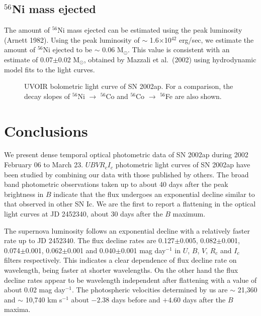 \subsection{${}^{56}$Ni mass ejected}

The amount of $^{56}$Ni mass ejected can be estimated using the peak luminosity (Arnett 1982).
Using the peak luminosity of $\sim$ 1.6$\times$10$^{42}$ erg/sec, we estimate the
amount of $^{56}$Ni ejected to be $\sim$ 0.06 M$_{\odot}$. This value is 
consistent with an estimate of 0.07$\pm$0.02 M$_{\odot}$, obtained by Mazzali
et al.\ (2002) using hydrodynamic model fits to the light curves. 

\begin{figure}
\caption{UVOIR bolometric light curve of SN 2002ap. For a comparison, the decay slopes of 
${}^{56}$Ni $\rightarrow$ ${}^{56}$Co and ${}^{56}$Co $\rightarrow$ ${}^{56}$Fe are also shown.} 
\end{figure}

\section{Conclusions}

We present dense temporal optical photometric data of SN 2002ap
during 2002 February 06 to March 23. $UBVR_cI_c$ photometric light curves of SN
2002ap have been studied by combining our data with those published by
others. The broad band photometric observations taken up to about 40 days 
after the peak brightness in $B$ indicate that the flux undergoes an
exponential decline similar to that observed in other SN Ic. We are the 
first to report a flattening in the optical light curves at JD 2452340, 
about 30 days after the $B$ maximum.

The supernova luminosity follows an exponential decline with a relatively faster
rate up to JD 2452340. The flux decline rates are
0.127$\pm$0.005, 0.082$\pm$0.001, 0.074$\pm$0.001, 0.062$\pm$0.001 and
0.040$\pm$0.001 mag day$^{-1}$ in $U$, $B$, $V$, $R_c$ and $I_c$ filters respectively.
This indicates a clear dependence of flux decline rate on wavelength, being
faster at shorter wavelengths. On the other hand the flux decline rates
appear to be wavelength independent after flattening with a value of about
0.02 mag day$^{-1}$. The photospheric velocities determined by us are $\sim$ 21,360
 and $\sim$ 10,740 km s$^{-1}$ about $-2.38$ days before and $+4.60$ days after the
$B$ maxima. 


